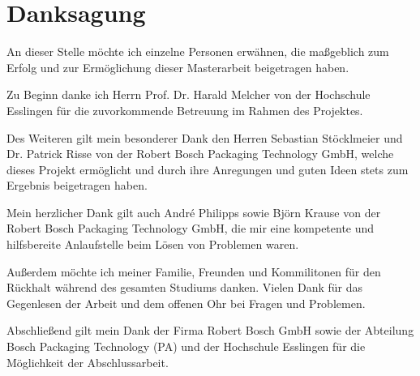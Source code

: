 \chapter*{Danksagung}
\thispagestyle{empty}

An dieser Stelle möchte ich einzelne Personen erwähnen, die maßgeblich zum Erfolg und zur Ermöglichung dieser
Masterarbeit beigetragen haben.

Zu Beginn danke ich Herrn Prof. Dr. Harald Melcher von der Hochschule Esslingen für die zuvorkommende Betreuung im Rahmen
des Projektes.

Des Weiteren gilt mein besonderer Dank den Herren Sebastian Stöcklmeier und Dr. Patrick Risse von der Robert Bosch
Packaging Technology GmbH, welche dieses Projekt ermöglicht und durch ihre Anregungen und guten Ideen stets zum Ergebnis
beigetragen haben.

Mein herzlicher Dank gilt auch André Philipps sowie Björn Krause von der Robert Bosch Packaging Technology GmbH, die mir
eine kompetente und hilfsbereite Anlaufstelle beim Lösen von Problemen waren.

Außerdem möchte ich meiner Familie, Freunden und Kommilitonen für den Rückhalt während des gesamten Studiums danken.
Vielen Dank für das Gegenlesen der Arbeit und dem offenen Ohr bei Fragen und Problemen.

Abschließend gilt mein Dank der Firma Robert Bosch GmbH sowie der Abteilung Bosch Packaging Technology (PA) und der
Hochschule Esslingen für die Möglichkeit der Abschlussarbeit.